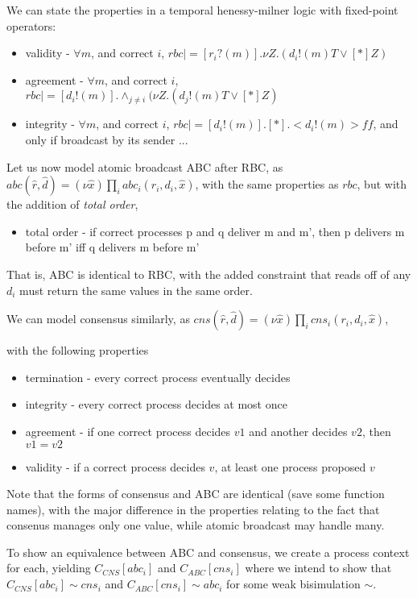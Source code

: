 We can state the properties in a temporal henessy-milner logic with fixed-point operators:
\begin{itemize}
\item validity - $ \forall m$, and correct $i$, $rbc |= [ r_i?(m) ] . \nu Z . ( d_i!(m)T \vee [*]Z) $
\item agreement - $ \forall m$, and correct $i$, $rbc |= [ d_i!(m) ] . \wedge_{j \neq i} ( \nu Z . (d_j!(m)T \vee [*]Z) $
\item integrity - $ \forall m$, and correct $i$, $rbc |= [ d_i!(m) ] . [ * ] . < d_i!(m) > ff $, and only if broadcast by its sender ...
\end{itemize}

Let us now model atomic broadcast ABC after RBC, as 
$abc(\hat{r}, \hat{d}) = (\nu \hat{x}) \prod_i abc_i(r_i, d_i, \hat{x})$,
with the same properties as $rbc$, but with the addition of \emph{total order},
\begin{itemize}
\item total order - if correct processes p and q deliver m and m', then p delivers m before m' iff q delivers m before m'
\end{itemize}


That is, ABC is identical to RBC, with the added constraint that reads off of any $d_i$ 
must return the same values in the same order.

We can model consensus similarly, as 
$cns(\hat{r}, \hat{d}) = (\nu \hat{x}) \prod_i cns_i(r_i, d_i, \hat{x})$,

with the following properties

\begin{itemize}
\item termination - every correct process eventually decides
\item integrity - every correct process decides at most once
\item agreement - if one correct process decides $v1$ and another decides $v2$, then $v1=v2$
\item validity - if a correct process decides $v$, at least one process proposed $v$
\end{itemize}

Note that the forms of consensus and ABC are identical (save some function names),
with the major difference in the properties relating to the fact that consenus
manages only one value, while atomic broadcast may handle many.

To show an equivalence between ABC and consensus,
we create a process context for each,
yielding $ C_{CNS}[ abc_i ] $ and $ C_{ABC}[ cns_i ] $ 
where we intend to show that 
$ C_{CNS}[ abc_i ] \sim cns_i $ and $ C_{ABC}[ cns_i ] \sim abc_i $ for
some weak bisimulation $\sim$.

